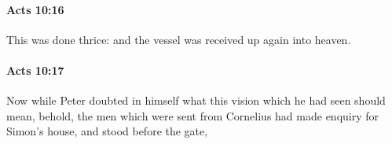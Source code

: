 		\paragraph{Acts 10:16} %
			\label{ACTS-10-16}

			This was done thrice: and the vessel was received up again into heaven.

			\begin{framed}
			\scriptsize
				\begin{compactdesc}
					\item[SBLG] 
				\end{compactdesc}
			\end{framed}

		\paragraph{Acts 10:17} %
			\label{ACTS-10-17}

			Now while Peter doubted in himself what this vision which he had seen should mean, behold, the men which were sent from Cornelius had made enquiry for Simon's house, and stood before the gate,


